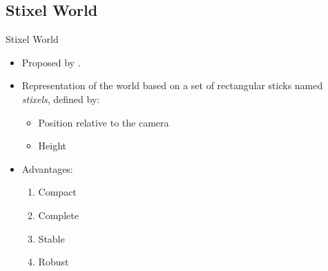 \graphicspath{
  {./images/bmps/}{./images/vects/}{./images/}
  {./images/presentation/bmps/}{./images/presentation/vects/}{./images/presentation/}
  {./images/chapter00/bmps/}{./images/chapter00/vects/}{./images/chapter00/}
  {./images/chapter04/bmps/}{./images/chapter04/vects/}{./images/chapter04/}
}

\subsection{Stixel World}

\begin{frame}{Stixel World}
 \begin{itemize}
  \item<1-> Proposed by \cite{badino2009stixel}.
  \item<1-> Representation of the world based on a set of rectangular sticks named \emph{stixels}, defined by:
  \begin{itemize}
   \item<1-> Position relative to the camera
   \item<1-> Height
  \end{itemize}
  
  \item<2->Advantages:
  \begin{enumerate}
   \item<3-> Compact
   \item<4-> Complete
   \item<5-> Stable
   \item<6-> Robust   
  \end{enumerate}
 \end{itemize}

\end{frame}

